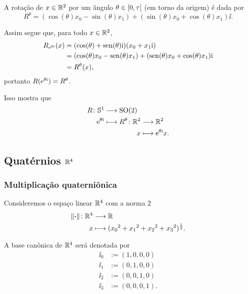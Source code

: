 A rotação de $x \in \mathbb{R}^2$ por um ângulo $\theta \in \left[0,\allowbreak \tau\right[$ (em torno da origem) é dada por
	\begin{equation*}
	R^\theta = (\cos(\theta)x_0 - \sin(\theta)x_1) + (\sin(\theta)x_0 + \cos(\theta)x_1) \ii.
	\end{equation*}

Assim segue que, para todo $x \in \mathbb{R}^2$,
	\begin{align*}
	R_{\mathrm{e}^{\theta \mathrm{i}}}(x) &= (\cos(\theta) + \operatorname{sen}(\theta)\mathrm{i})(x_0 + x_1 \mathrm{i}) \\
		&= (\cos(\theta)x_0 - \operatorname{sen}(\theta)x_1) + (\operatorname{sen}(\theta)x_0 + \cos(\theta)x_1) \mathrm{i} \\
		&= R^\theta(x),
	\end{align*}
portanto $R(\mathrm{e}^{\theta \mathrm{i}}) = R^{\theta}$.

Isso mostra que
	\begin{align*}
	\func{R}{\S^1}{\SO(2)}{\e^{\theta \ii}}{
		\begin{aligned}[t]
			\func{R^{\theta}}{\R^2}{\R^2}{x}{\e^{\theta \ii} x}.
		\end{aligned}
	}
	\end{align*}



\subsection{Quatérnios \texorpdfstring{$\mathbb{R}^4$}{}}

\subsubsection{Multiplicação quaterniônica}

Consideremos o espaço linear $\mathbb{R}^4$ com a norma $2$
	\begin{align*}
	{\left\Vert{\bm{\cdot}}\right\Vert}\colon {\mathbb{R}^4} &\longrightarrow {\mathbb{R}} \\{x} &\longmapsto ({x_0}^2+{x_1}^2+{x_2}^2+{x_3}^2)^{\frac{1}{2}}.
	\end{align*}

A base canônica de $\mathbb{R}^4$ será denotada por
	\begin{align*}
	\ii_0 &:= (1,0,0,0) \\
	\ii_1 &:= (0,1,0,0) \\
	\ii_2 &:= (0,0,1,0) \\
	\ii_3 &:= (0,0,0,1).
	\end{align*}

